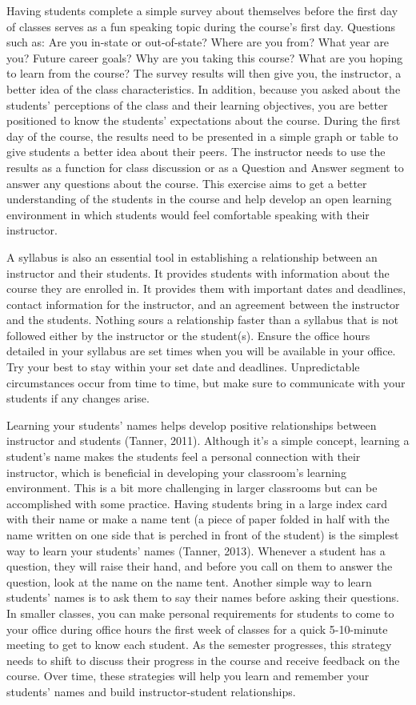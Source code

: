 \documentclass{book}
\begin{document}
Having students complete a simple survey about themselves before the first day
of classes serves as a fun speaking topic during the course's first day.
Questions such as: Are you in-state or out-of-state? Where are you from? What
year are you? Future career goals? Why are you taking this course? What are
you hoping to learn from the course? The survey results will then give you,
the instructor, a better idea of the class characteristics. In addition,
because you asked about the students' perceptions of the class and their
learning objectives, you are better positioned to know the students'
expectations about the course. During the first day of the course, the results
need to be presented in a simple graph or table to give students a better idea
about their peers. The instructor needs to use the results as a function for
class discussion or as a Question and Answer segment to answer any questions
about the course. This exercise aims to get a better understanding of the
students in the course and help develop an open learning environment in which
students would feel comfortable speaking with their instructor.~

A syllabus is also an essential tool in establishing a relationship between an
instructor and their students. It provides students with information about the
course they are enrolled in. It provides them with important dates and
deadlines, contact information for the instructor, and an agreement between
the instructor and the students. Nothing sours a relationship faster than a
syllabus that is not followed either by the instructor or the student(s).
Ensure the office hours detailed in your syllabus are set times when you will
be available in your office. Try your best to stay within your set date and
deadlines. Unpredictable circumstances occur from time to time, but make sure
to communicate with your students if any changes arise.~

Learning your students' names helps develop positive relationships between
instructor and students (Tanner, 2011). Although it's a simple concept,
learning a student's name makes the students feel a personal connection with
their instructor, which is beneficial in developing your classroom's learning
environment. This is a bit more challenging in larger classrooms but can be
accomplished with some practice. Having students bring in a large index card
with their name or make a name tent (a piece of paper folded in half with the
name written on one side that is perched in front of the student) is the
simplest way to learn your students' names (Tanner, 2013). Whenever a student
has a question, they will raise their hand, and before you call on them to
answer the question, look at the name on the name tent. Another simple way to
learn students' names is to ask them to say their names before asking their
questions. In smaller classes, you can make personal requirements for students
to come to your office during office hours the first week of classes for a
quick 5-10-minute meeting to get to know each student. As the semester
progresses, this strategy needs to shift to discuss their progress in the
course and receive feedback on the course. Over time, these strategies will
help you learn and remember your students' names and build instructor-student
relationships.~~
\end{document}
